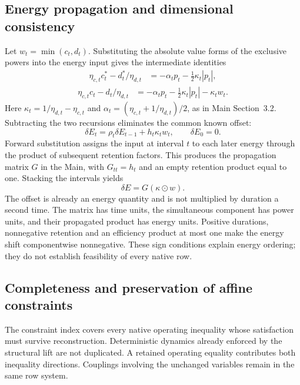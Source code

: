 \subsection{Energy propagation and dimensional consistency}
Let $w_t=\min(c_t,d_t)$. Substituting the absolute value forms of the
exclusive powers into the energy input gives the intermediate identities
\begin{equation}\begin{aligned}
\eta_{c, t}c_t^*-d_t^*/\eta_{d, t}
 &=-\alpha_t p_t-\tfrac 12\kappa_t|p_t|,\label{eq:input_star}\end{aligned}\end{equation}
\begin{equation}\begin{aligned}
\eta_{c, t}c_t-d_t/\eta_{d, t}
 &=-\alpha_t p_t-\tfrac 12\kappa_t|p_t|-\kappa_tw_t .\label{eq:input_relaxed}
\end{aligned}\end{equation}
Here $\kappa_t=1/\eta_{d,t}-\eta_{c,t}$ and
$\alpha_t=(\eta_{c,t}+1/\eta_{d,t})/2$, as in Main Section~3.2.
Subtracting the two recursions eliminates the common known offset:
\begin{equation}
\delta E_t=\rho_t\delta E_{t-1}+h_t\kappa_tw_t,
\qquad \delta E_0=0 .\label{eq:shift_recurrence}
\end{equation}
Forward substitution assigns the input at interval $t$ to each later
energy through the product of subsequent retention factors. This produces
the propagation matrix $G$ in the Main, with $G_{tt}=h_t$ and an empty
retention product equal to one. Stacking the intervals yields
\begin{equation}
\delta E=G(\kappa\odot w).\label{eq:shift_stack}
\end{equation}
The offset is already an energy quantity and is not multiplied by duration
a second time. The matrix has time units, the simultaneous component has
power units, and their propagated product has energy units. Positive
durations, nonnegative retention and an efficiency product at most one
make the energy shift componentwise nonnegative. These sign conditions
explain energy ordering; they do not establish feasibility of every native row.

\subsection{Completeness and preservation of affine constraints}
The constraint index covers every native operating inequality whose
satisfaction must survive reconstruction. Deterministic dynamics already
enforced by the structural lift are not duplicated. A retained operating
equality contributes both inequality directions. Couplings involving the
unchanged variables remain in the same row system.

